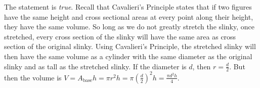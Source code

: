 \documentclass[11pt,letterpaper]{article}
\begin{document}
\sol The statement is \textit{true}. Recall that Cavalieri's Principle states that if two figures have the same height and cross sectional areas at every point along their height, they have the same volume. So long as we do not greatly stretch the slinky, once stretched, every cross section of the slinky will have the same area as cross section of the original slinky. Using Cavalieri's Principle, the stretched slinky will then have the same volume as a cylinder with the same diameter as the original slinky and as tall as the stretched slinky. If the diameter is $d$, then $r= \frac{d}{2}$. But then the volume is $V= A_{\text{base}} h= \pi r^2h= \pi \left( \frac{d}{2} \right)^2 h= \frac{\pi d^2 h}{4}$. 
\end{document}
